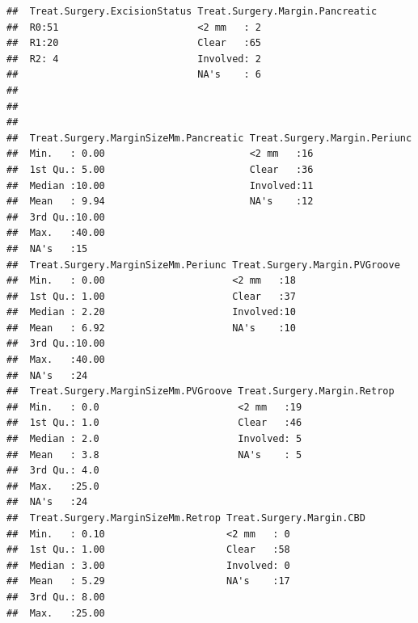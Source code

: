 \documentclass{article}\usepackage[]{graphicx}\usepackage[]{color}
\makeatletter
\newenvironment{kframe}{%
 \def\at@end@of@kframe{}%
 \ifinner\ifhmode%
  \def\at@end@of@kframe{\end{minipage}}%
  \begin{minipage}{\columnwidth}%
 \fi\fi%
 \def\FrameCommand##1{\hskip\@totalleftmargin \hskip-\fboxsep
 \colorbox{shadecolor}{##1}\hskip-\fboxsep
     \hskip-\linewidth \hskip-\@totalleftmargin \hskip\columnwidth}%
 \MakeFramed {\advance\hsize-\width
   \@totalleftmargin\z@ \linewidth\hsize
   \@setminipage}}%
 {\par\unskip\endMakeFramed%
 \at@end@of@kframe}
\newenvironment{knitrout}{}{} %
\makeatother
\begin{document}
\begin{knitrout}
\begin{kframe}
\begin{verbatim}
##  Treat.Surgery.ExcisionStatus Treat.Surgery.Margin.Pancreatic
##  R0:51                        <2 mm   : 2                    
##  R1:20                        Clear   :65                    
##  R2: 4                        Involved: 2                    
##                               NA's    : 6                    
##                                                              
##                                                              
##                                                              
##  Treat.Surgery.MarginSizeMm.Pancreatic Treat.Surgery.Margin.Periunc
##  Min.   : 0.00                         <2 mm   :16                 
##  1st Qu.: 5.00                         Clear   :36                 
##  Median :10.00                         Involved:11                 
##  Mean   : 9.94                         NA's    :12                 
##  3rd Qu.:10.00                                                     
##  Max.   :40.00                                                     
##  NA's   :15                                                        
##  Treat.Surgery.MarginSizeMm.Periunc Treat.Surgery.Margin.PVGroove
##  Min.   : 0.00                      <2 mm   :18                  
##  1st Qu.: 1.00                      Clear   :37                  
##  Median : 2.20                      Involved:10                  
##  Mean   : 6.92                      NA's    :10                  
##  3rd Qu.:10.00                                                   
##  Max.   :40.00                                                   
##  NA's   :24                                                      
##  Treat.Surgery.MarginSizeMm.PVGroove Treat.Surgery.Margin.Retrop
##  Min.   : 0.0                        <2 mm   :19                
##  1st Qu.: 1.0                        Clear   :46                
##  Median : 2.0                        Involved: 5                
##  Mean   : 3.8                        NA's    : 5                
##  3rd Qu.: 4.0                                                   
##  Max.   :25.0                                                   
##  NA's   :24                                                     
##  Treat.Surgery.MarginSizeMm.Retrop Treat.Surgery.Margin.CBD
##  Min.   : 0.10                     <2 mm   : 0             
##  1st Qu.: 1.00                     Clear   :58             
##  Median : 3.00                     Involved: 0             
##  Mean   : 5.29                     NA's    :17             
##  3rd Qu.: 8.00                                             
##  Max.   :25.00                                             

\end{verbatim}
\end{kframe}
\end{knitrout}
\end{document}
